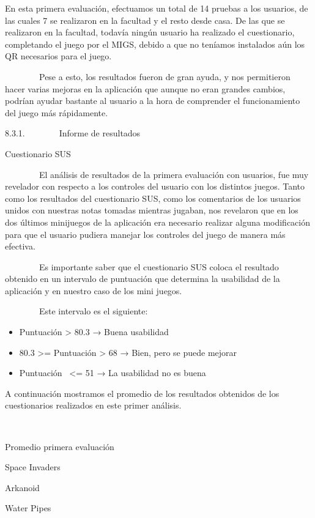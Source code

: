 \documentclass[]{article}
\begin{document}
En esta primera evaluación, efectuamos un total de 14 pruebas a los
usuarios, de las cuales 7 se realizaron en la facultad y el resto desde
casa. De las que se realizaron en la facultad, todavía ningún usuario ha
realizado el cuestionario, completando el juego por el MIGS, debido a
que no teníamos instalados aún los QR necesarios para el juego.

~~~~~~~~Pese a esto, los resultados fueron de gran ayuda, y nos
permitieron hacer varias mejoras en la aplicación que aunque no eran
grandes cambios, podrían ayudar bastante al usuario a la hora de
comprender el funcionamiento del juego más rápidamente.

8.3.1.~~~~~~~~Informe de resultados

Cuestionario SUS

~~~~~~~~El análisis de resultados de la primera evaluación con usuarios,
fue muy revelador con respecto a los controles del usuario con los
distintos juegos. Tanto como los resultados del cuestionario SUS, como
los comentarios de los usuarios unidos con nuestras notas tomadas
mientras jugaban, nos revelaron que en los dos últimos minijuegos de la
aplicación era necesario realizar alguna modificación para que el
usuario pudiera manejar los controles del juego de manera más efectiva.

~~~~~~~~Es importante saber que el cuestionario SUS coloca el resultado
obtenido en un intervalo de puntuación que determina la usabilidad de la
aplicación y en nuestro caso de los mini juegos.

~~~~~~~~Este intervalo es el siguiente:

\begin{itemize}
\itemsep1pt\parskip0pt
\item
  Puntuación \textgreater{} 80.3 → Buena usabilidad
\item
  80.3 \textgreater{}= Puntuación \textgreater{} 68 → Bien, pero se
  puede mejorar
\item
  Puntuación ~\textless{}= 51 → La usabilidad no es buena
\end{itemize}

A continuación mostramos el promedio de los resultados obtenidos de los
cuestionarios realizados en este primer análisis.

~~~~~~~~

Promedio primera evaluación

Space Invaders

Arkanoid

Water Pipes
\end{document}
